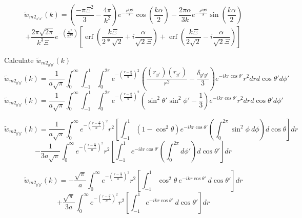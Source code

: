 \documentclass[double,12pt]{beavtex}
\begin{document}
\begin{displaymath}{\widetilde{w}_{{m2}_{x'x'}}(k)=\left(\frac{-\pi{\Xi}^2}{3}-\frac{4\pi}{k^2}\right)e^{-\frac{k^2\Xi^2}{8}}\cos(\frac{k\alpha}{2})-\frac{2\pi\alpha}{3k}e^{-\frac{k^2\Xi^2}{8}}\sin(\frac{k\alpha}{2})}\end{displaymath} 
\begin{equation}{+\frac{2\pi\sqrt{2\pi}}{k^3\Xi}e^{-\left(\frac{\alpha^2}{2\Xi^2}\right)}\left[\operatorname{erf}\left(\frac{k\Xi}{2*\sqrt{2}}+i\frac{\alpha}{\sqrt{2}\Xi}\right)+\operatorname{erf}\left(\frac{k\Xi}{2\sqrt{2}}-i\frac{\alpha}{\sqrt{2}\Xi}\right)\right]}\end{equation} 


Calculate $\widetilde{w}_{{m2}_{y'y'}}(k)$ 
\begin{equation}{\widetilde{w}_{{m2}_{y'y'}}(k)=\frac{1}{a\sqrt{\pi}}\int_{0}^{\infty}\int_{-1}^{1}\int_{0}^{2\pi}e^{-\left(\frac{r-\frac{\alpha}{2}}{a}\right)^2}\left(\frac{(r_{y'})(r_{y'})}{r^2}-\frac{\delta_{y'y'}}{3}\right)e^{-ikr\cos\theta'}r^2d{r}d{\cos\theta'}d{\phi'}}\end{equation}
\begin{equation}{\widetilde{w}_{{m2}_{y'y'}}(k)=\frac{1}{a\sqrt{\pi}}\int_{0}^{\infty}\int_{-1}^{1}\int_{0}^{2\pi}e^{-\left(\frac{r-\frac{\alpha}{2}}{a}\right)^2}\left(\sin^2\theta'\sin^2\phi'-\frac{1}{3}\right)e^{-ikr\cos\theta'}r^2d{r}d{\cos\theta'}d{\phi'}}\end{equation}

\begin{displaymath}{\widetilde{w}_{{m2}_{y'y'}}(k)=\frac{1}{a\sqrt{\pi}}\int_{0}^{\infty}e^{-\left(\frac{r-\frac{\alpha}{2}}{a}\right)^2}r^2\left[\int_{-1}^{1}\left(1-\cos^2\theta\right)e^{-ikr\cos\theta'}\left(\int_{0}^{2\pi}\sin^2\phi~d{\phi}\right)d{\cos\theta}\right]d{r}}\end{displaymath} 
\begin{equation}{-\frac{1}{3a\sqrt{\pi}}\int_{0}^{\infty}e^{-\left(\frac{r-\frac{\alpha}{2}}{a}\right)^2}r^2\left[\int_{-1}^{1}e^{-ikr\cos\theta'}\left(\int_{0}^{2\pi}d{\phi'}\right)d{\cos\theta'}\right]d{r}}\end{equation}


\begin{displaymath}{\widetilde{w}_{{m2}_{y'y'}}(k)=-\frac{\sqrt{\pi}}{a}\int_{0}^{\infty}e^{-\left(\frac{r-\frac{\alpha}{2}}{a}\right)^2}r^2\left[\int_{-1}^{1}\cos^2\theta~e^{-ikr\cos\theta'}~d{\cos\theta'}\right]d{r}}\end{displaymath} 
\begin{equation}{+\frac{\sqrt{\pi}}{3a}\int_{0}^{\infty}e^{-\left(\frac{r-\frac{\alpha}{2}}{a}\right)^2}r^2\left[\int_{-1}^{1}e^{-ikr\cos\theta'}~d{\cos\theta'}\right]d{r}}\end{equation}
\end{document}
